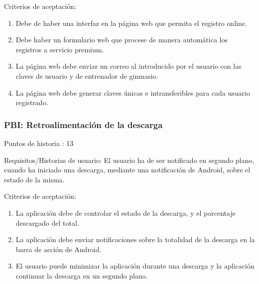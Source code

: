 \documentclass[11pt,a4paper]{report}
\begin{document}
Criterios de aceptación:
\begin{enumerate}
	\item Debe de haber una interfaz en la página web que permita el registro online.
	
	\item Debe haber un formulario web que procese de manera automática los registros a servicio premium.
	
	\item La página web debe enviar un correo al introducido por el usuario con las claves de usuario y de entrenador de gimnasio.
	
	\item La página web debe generar claves únicas e intransferibles para cada usuario registrado.
	
\end{enumerate}
\subsubsection{PBI: Retroalimentación de la descarga} 

Puntos de historia : 13

Requisitos/Historias de usuario: El usuario ha de ser notificado en segundo plano, cuando ha iniciado una descarga, mediante una notificación de Android, sobre el estado de la misma.

Criterios de aceptación:
\begin{enumerate}
	\item La aplicación debe de controlar el estado de la descarga, y el porcentaje descargado del total.
	
	\item La aplicación debe enviar notificaciones sobre la totalidad de la descarga en la barra de acción de Android.
	
	\item El usuario puede minimizar la aplicación durante una descarga y la aplicación continuar la descarga en un segundo plano.
\end{enumerate}
\end{document}
